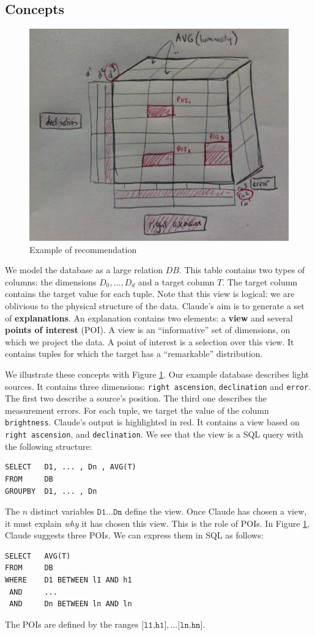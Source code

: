 \subsection{Concepts}
\begin{figure}[t!]
\centering
\includegraphics[width=0.9\columnwidth]{images/cube}
\caption{Example of recommendation}
\label{cube}
\end{figure}
We model the database as a large relation $DB$. This table contains two types
of columns: the dimensions $D_0, \ldots, D_d$ and a target column $T$. The
target column contains the target value for each tuple. Note that this view is
logical: we are oblivious to the physical structure of the data.  Claude's aim
is to generate a set of \textbf{explanations}.  An explanation contains two
elements: a \textbf{view} and several \textbf{points of interest} (POI). A view
is an ``informative'' set of dimensions, on which we project the data.  A point of
interest is a selection over this view. It contains tuples for which the target
has a ``remarkable'' distribution.

We illustrate these concepts with Figure \ref{cube}. Our example database
describes light sources.  It contains three dimensions: \texttt{right
ascension}, \texttt{declination} and \texttt{error}. The first two describe a
source's position. The third one describes the measurement errors. For each
tuple, we target the value of the column \texttt{brightness}. Claude's output
is highlighted in red. It contains a view based on \texttt{right ascension},
and \texttt{declination}. We see that the view is a SQL query with the
following structure:
\begin{verbatim}
SELECT   D1, ... , Dn , AVG(T)
FROM     DB 
GROUPBY  D1, ... , Dn
\end{verbatim}
The $n$ distinct variables $\texttt{D1} \ldots \texttt{Dn}$ define the view. Once
Claude has chosen a view, it must explain \emph{why} it has chosen this view.
This is the role of POIs. In Figure \ref{cube}, Claude suggests three POIs. We
can express them in SQL as follows:
\begin{verbatim}
SELECT   AVG(T)
FROM     DB
WHERE    D1 BETWEEN l1 AND h1
 AND     ...
 AND     Dn BETWEEN ln AND ln
\end{verbatim}
The POIs are defined by the ranges $\texttt{[l1,h1]}, \dots \texttt{[ln,hn]}$.


